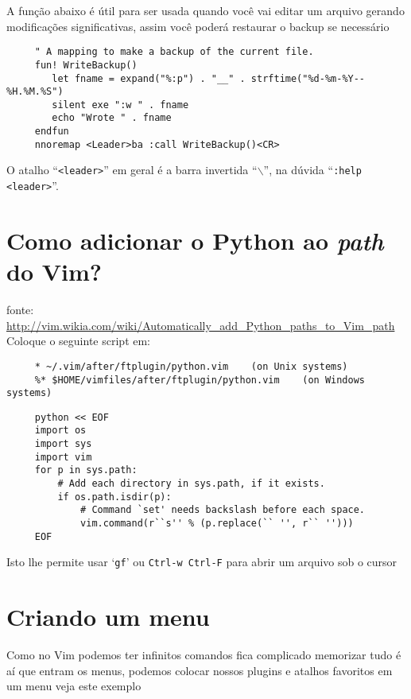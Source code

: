 A função abaixo é útil para ser usada quando você vai editar um arquivo
gerando modificações significativas, assim você poderá restaurar o backup se necessário

\begin{verbatim}
     " A mapping to make a backup of the current file.
     fun! WriteBackup()
        let fname = expand("%:p") . "__" . strftime("%d-%m-%Y--%H.%M.%S")
        silent exe ":w " . fname
        echo "Wrote " . fname
     endfun
     nnoremap <Leader>ba :call WriteBackup()<CR>
\end{verbatim}

{\Large {}} O atalho ``{\tt <leader>}'' em geral é a barra 
invertida ``$\backslash$'', na dúvida ``{\tt :help <leader>}''.

\section{Como adicionar o Python ao {\em path} do Vim?}
\label{Como adicionar o Python ao path do Vim?}

fonte:
\url{http://vim.wikia.com/wiki/Automatically_add_Python_paths_to_Vim_path}
Coloque o seguinte script em:

\begin{verbatim}
     * ~/.vim/after/ftplugin/python.vim    (on Unix systems)
     %* $HOME/vimfiles/after/ftplugin/python.vim    (on Windows systems)
\end{verbatim}

\begin{verbatim}
     python << EOF
     import os
     import sys
     import vim
     for p in sys.path:
         # Add each directory in sys.path, if it exists.
         if os.path.isdir(p):
             # Command `set' needs backslash before each space.
             vim.command(r``s'' % (p.replace(`` '', r`` '')))
     EOF
\end{verbatim}

Isto lhe permite usar `{\tt gf}' ou {\tt Ctrl-w Ctrl-F} para abrir um arquivo sob o cursor

\section{Criando um menu}
\label{Criando um menu}

Como no Vim podemos ter infinitos comandos fica complicado memorizar tudo
é aí que entram os menus, podemos colocar nossos plugins e atalhos favoritos
em um menu veja este exemplo

